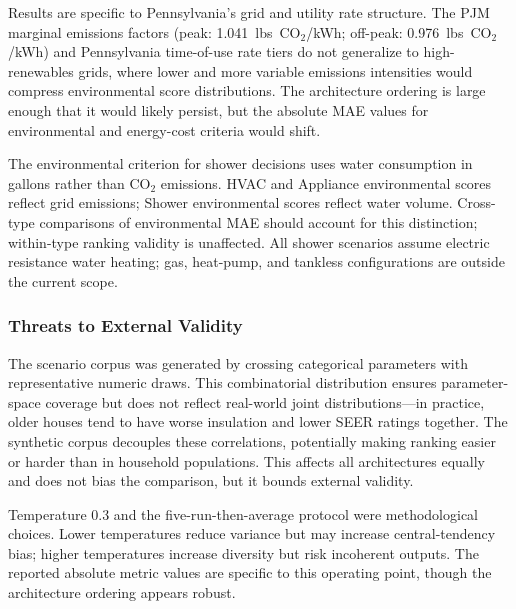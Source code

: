 \documentclass[a4paper,fleqn]{cas-dc}
\begin{document}
Results are specific to Pennsylvania's grid and utility rate structure. The PJM marginal emissions factors (peak: 1.041~lbs~CO$_2$/kWh; off-peak: 0.976~lbs~CO$_2$/kWh) and Pennsylvania time-of-use rate tiers do not generalize to high-renewables grids, where lower and more variable emissions intensities would compress environmental score distributions. The architecture ordering is large enough that it would likely persist, but the absolute MAE values for environmental and energy-cost criteria would shift.

The environmental criterion for shower decisions uses water consumption in gallons rather than CO$_2$ emissions. HVAC and Appliance environmental scores reflect grid emissions; Shower environmental scores reflect water volume. Cross-type comparisons of environmental MAE should account for this distinction; within-type ranking validity is unaffected. All shower scenarios assume electric resistance water heating; gas, heat-pump, and tankless configurations are outside the current scope.

\subsubsection{Threats to External Validity}

The scenario corpus was generated by crossing categorical parameters with representative numeric draws. This combinatorial distribution ensures parameter-space coverage but does not reflect real-world joint distributions---in practice, older houses tend to have worse insulation and lower SEER ratings together. The synthetic corpus decouples these correlations, potentially making ranking easier or harder than in household populations. This affects all architectures equally and does not bias the comparison, but it bounds external validity.

Temperature 0.3 and the five-run-then-average protocol were methodological choices. Lower temperatures reduce variance but may increase central-tendency bias; higher temperatures increase diversity but risk incoherent outputs. The reported absolute metric values are specific to this operating point, though the architecture ordering appears robust.
\end{document}
